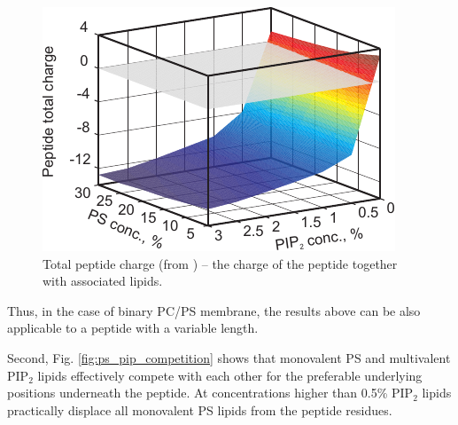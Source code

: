 \begin{figure}[!ht]
\begin{center}
  \includegraphics[scale=1.4]{../figures/total_peptide_charge.pdf}
\end{center}
 \caption[Total peptide charge]{Total peptide charge (from \cite{Kiselev2011}) -- the charge of the peptide together with associated lipids.}
\label{fig:total_peptide_charge}
\end{figure}
Thus, in the case of binary PC/PS membrane, the results above can be also applicable to a peptide with a variable length.

Second, Fig. \ref{fig:ps_pip_competition} shows that monovalent PS and multivalent PIP$_2$ lipids effectively compete with each other for the preferable underlying positions underneath the peptide. At concentrations higher than 0.5\% PIP$_2$ lipids practically displace all monovalent PS lipids from the peptide residues.

